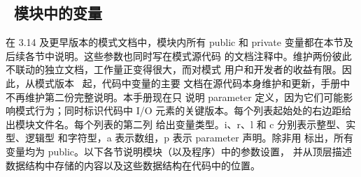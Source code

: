 \vsssub
\subsection{~模块中的变量} \label{sec:variables}
\vsssub

\noindent
在 3.14 及更早版本的模式文档中，模块内所有 {\F public} 和
{\F private} 变量都在本节及后续各节中说明。这些参数也同时写在模式源代码
的文档注释中。维护两份彼此不联动的独立文档，工作量正变得很大，而对模式
用户和开发者的收益有限。因此，从模式版本 \WWver\ 起，代码中变量的主要
文档在源代码本身维护和更新，手册中不再维护第二份完整说明。本手册现在只
说明 {\F parameter} 定义，因为它们可能影响模式行为；同时标识代码中 I/O
元素的关键版本。每个列表起始处的右边距给出模块文件名。每个列表的第二列
给出变量类型。{\F i}、{\F r}、{\F l} 和 {\F c} 分别表示整型、实型、逻辑型
和字符型，{\F a} 表示数组，{\F p} 表示 {\F parameter} 声明。除非用 \opt
标出，所有变量均为 public。以下各节说明模块（以及程序）中的参数设置，
并从顶层描述数据结构中存储的内容以及这些数据结构在代码中的位置。
